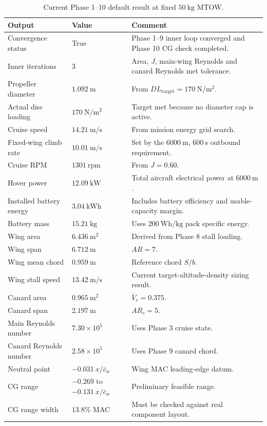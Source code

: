 \begin{table}[H]
\centering
\small
\caption{Current Phase 1--10 default result at fixed \(50~\mathrm{kg}\) MTOW.}
\label{tab:ppa_current_result}
\begin{tabularx}{\textwidth}{@{}p{}p{}X@{}}
\toprule
\textbf{Output} & \textbf{Value} & \textbf{Comment} \\
\midrule
Convergence status & True & Phase 1--9 inner loop converged and Phase 10 CG check completed. \\
Inner iterations & 3 & Area, \(J\), main-wing Reynolds and canard Reynolds met tolerance. \\
Propeller diameter & \(1.092~\mathrm{m}\) & From \(DL_{\mathrm{target}}=170~\mathrm{N/m^2}\). \\
Actual disc loading & \(170~\mathrm{N/m^2}\) & Target met because no diameter cap is active. \\
Cruise speed & \(14.21~\mathrm{m/s}\) & From mission energy grid search. \\
Fixed-wing climb rate & \(10.01~\mathrm{m/s}\) & Set by the \(6000~\mathrm{m}\), \(600~\mathrm{s}\) outbound requirement. \\
Cruise RPM & \(1301~\mathrm{rpm}\) & From \(J=0.60\). \\
Hover power & \(12.09~\mathrm{kW}\) & Total aircraft electrical power at \(6000~\mathrm{m}\). \\
Installed battery energy & \(3.04~\mathrm{kWh}\) & Includes battery efficiency and usable-capacity margin. \\
Battery mass & \(15.21~\mathrm{kg}\) & Uses \(200~\mathrm{Wh/kg}\) pack specific energy. \\
Wing area & \(6.436~\mathrm{m^2}\) & Derived from Phase 8 stall loading. \\
Wing span & \(6.712~\mathrm{m}\) & \(AR=7\). \\
Wing mean chord & \(0.959~\mathrm{m}\) & Reference chord \(S/b\). \\
Wing stall speed & \(13.42~\mathrm{m/s}\) & Current target-altitude-density sizing result. \\
Canard area & \(0.965~\mathrm{m^2}\) & \(\bar{V}_c=0.375\). \\
Canard span & \(2.197~\mathrm{m}\) & \(AR_c=5\). \\
Main Reynolds number & \(7.30\times10^5\) & Uses Phase 3 cruise state. \\
Canard Reynolds number & \(2.58\times10^5\) & Uses Phase 9 canard chord. \\
Neutral point & \(-0.031~x/\bar{c}_w\) & Wing MAC leading-edge datum. \\
CG range & \(-0.269\) to \(-0.131~x/\bar{c}_w\) & Preliminary feasible range. \\
CG range width & \(13.8\%\) MAC & Must be checked against real component layout. \\
\bottomrule
\end{tabularx}
\end{table}

